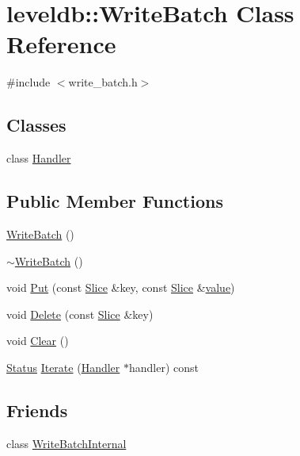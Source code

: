 \hypertarget{classleveldb_1_1_write_batch}{}\section{leveldb\+:\+:Write\+Batch Class Reference}
\label{classleveldb_1_1_write_batch}


{\ttfamily \#include $<$write\+\_\+batch.\+h$>$}

\subsection*{Classes}
\begin{DoxyCompactItemize}
\item 
class \hyperlink{classleveldb_1_1_write_batch_1_1_handler}{Handler}
\end{DoxyCompactItemize}
\subsection*{Public Member Functions}
\begin{DoxyCompactItemize}
\item 
\hyperlink{classleveldb_1_1_write_batch_a5287eda973cfd100149a034c871dcc44}{Write\+Batch} ()
\item 
\hyperlink{classleveldb_1_1_write_batch_a5bc7decc31279f2457839b30ad8daca5}{$\sim$\+Write\+Batch} ()
\item 
void \hyperlink{classleveldb_1_1_write_batch_a30770379143a7ccb4ede18ddf0e45bf3}{Put} (const \hyperlink{classleveldb_1_1_slice}{Slice} \&key, const \hyperlink{classleveldb_1_1_slice}{Slice} \&\hyperlink{cache_8cc_a0f61d63b009d0880a89c843bd50d8d76}{value})
\item 
void \hyperlink{classleveldb_1_1_write_batch_a473da7f94483dab253cc36b7b231ce53}{Delete} (const \hyperlink{classleveldb_1_1_slice}{Slice} \&key)
\item 
void \hyperlink{classleveldb_1_1_write_batch_afd5058344dc9be113919a5110129006f}{Clear} ()
\item 
\hyperlink{classleveldb_1_1_status}{Status} \hyperlink{classleveldb_1_1_write_batch_ac6cb5a360bb095f4e9a6e817c4322a9d}{Iterate} (\hyperlink{classleveldb_1_1_write_batch_1_1_handler}{Handler} $\ast$handler) const 
\end{DoxyCompactItemize}
\subsection*{Friends}
\begin{DoxyCompactItemize}
\item 
class \hyperlink{classleveldb_1_1_write_batch_a0c491f15816190f8235ccd1367d5ae5f}{Write\+Batch\+Internal}
\end{DoxyCompactItemize}


